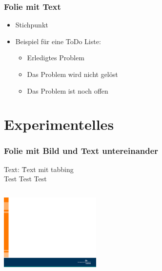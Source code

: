 \begin{frame}
	\frametitle{Folie mit Text}
	\vskip5mm
	\vspace{-0.4cm}%
	\begin{itemize}
		\itemsep1.2em
		\item Stichpunkt
		\item Beispiel für eine ToDo Liste:
		\begin{itemize}
			\itemsep1.2em
			\item[\done] Erledigtes Problem
			\item[\wontfix] Das Problem wird nicht gelöst
			\item[\open] Das Problem ist noch offen
		\end{itemize}
	\end{itemize}
\end{frame}

\section{Experimentelles}
\begin{frame}
\frametitle{Folie mit Bild und Text untereinander}
\begin{tabbing}
	Text: \qquad \= Text mit tabbing\\
	\> Test Test Test\\
\end{tabbing}
	\vskip5mm
	\begin{columns}
		\column{12cm}
		\centering
		\includegraphics[width=5.0cm]{style/images/master_background}\\
	\end{columns}
\end{frame}

